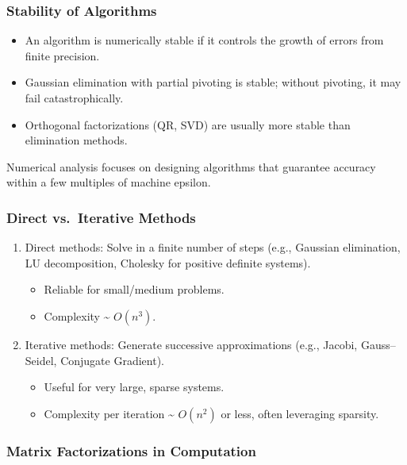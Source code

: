 \documentclass[
  letterpaper,
  DIV=11,
  numbers=noendperiod]{scrreprt}
\providecommand{\tightlist}{%
  \setlength{\itemsep}{0pt}\setlength{\parskip}{0pt}}
\begin{document}
\subsubsection{Stability of Algorithms}\label{stability-of-algorithms}

\begin{itemize}
\tightlist
\item
  An algorithm is numerically stable if it controls the growth of errors
  from finite precision.
\item
  Gaussian elimination with partial pivoting is stable; without
  pivoting, it may fail catastrophically.
\item
  Orthogonal factorizations (QR, SVD) are usually more stable than
  elimination methods.
\end{itemize}

Numerical analysis focuses on designing algorithms that guarantee
accuracy within a few multiples of machine epsilon.

\subsubsection{Direct vs.~Iterative
Methods}\label{direct-vs.-iterative-methods}

\begin{enumerate}
\def\labelenumi{\arabic{enumi}.}
\item
  Direct methods: Solve in a finite number of steps (e.g., Gaussian
  elimination, LU decomposition, Cholesky for positive definite
  systems).

  \begin{itemize}
  \tightlist
  \item
    Reliable for small/medium problems.
  \item
    Complexity \textasciitilde{} \(O(n^3)\).
  \end{itemize}
\item
  Iterative methods: Generate successive approximations (e.g., Jacobi,
  Gauss--Seidel, Conjugate Gradient).

  \begin{itemize}
  \tightlist
  \item
    Useful for very large, sparse systems.
  \item
    Complexity per iteration \textasciitilde{} \(O(n^2)\) or less, often
    leveraging sparsity.
  \end{itemize}
\end{enumerate}

\subsubsection{Matrix Factorizations in
Computation}\label{matrix-factorizations-in-computation}
\end{document}
